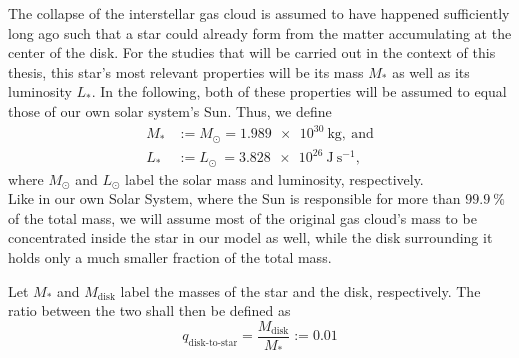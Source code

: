         The collapse of the interstellar gas cloud is assumed to have happened sufficiently long 
        ago such that a star could already form from the matter accumulating at the center of the
        disk. For the studies that will be carried out in the context of this thesis, this star's
        most relevant properties will be its mass $M_*$ as well as its luminosity $L_*$. 
        In the following, both of these properties will be assumed to equal those of our own solar
        system's Sun.
        Thus, we define
        \begin{align}
            M_*& := M_\odot = \SI{1.989e30}{\kg}
            ,\ \text{and} \\
            L_*& := L_\odot\ = \SI{3.828e26}{\joule~\second^{-1}},
        \end{align}
        where $M_\odot$ and $L_\odot$ label the solar mass and luminosity, respectively. \\

        Like in our own Solar System, where the Sun is responsible for more than $99.9~\%$ of the 
        total mass, we will assume most of the original gas cloud's mass to be
        concentrated inside the star in our model as well, while the disk surrounding it holds only 
        a much smaller fraction of the total mass. 

    \clearpage

        Let $M_*$ and $M_\text{disk}$ label the masses of the star and the disk, respectively.
        The ratio between the two shall then be defined as
        \begin{equation}
            q_\text{disk-to-star}
                =\frac{M_\text{disk}}{M_*}  
                :=0.01
        \end{equation}

